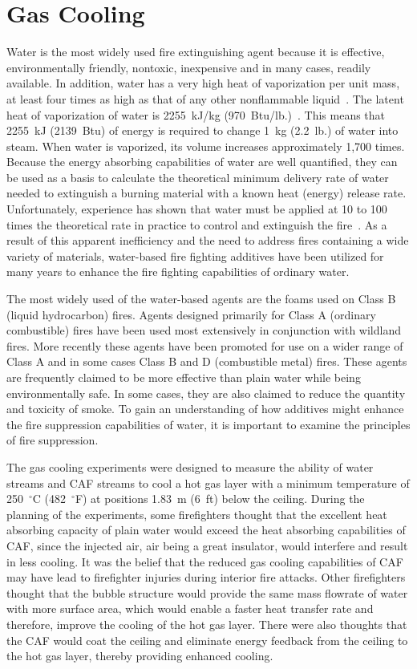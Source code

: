 \documentclass[12pt,oneside]{book}
\begin{document}
\section{Gas Cooling}
\label{sec:Gas_Cooling_discuss}
 
Water is the most widely used fire extinguishing agent because it is effective, environmentally friendly, nontoxic, inexpensive and in many cases, readily available. In addition, water has a very high heat of vaporization per unit mass, at least four times as high as that of any other nonflammable liquid~\cite{NFPA}. The latent heat of vaporization of water is 2255~kJ/kg (970~Btu/lb.)~\cite{NFPA}. This means that 2255~kJ (2139~Btu) of energy is required to change 1~kg (2.2~lb.) of water into steam.  When water is vaporized, its volume increases approximately 1,700 times. Because the energy absorbing capabilities of water are well quantified, they can be used as a basis to calculate the theoretical minimum delivery rate of water needed to extinguish a burning material with a known heat (energy) release rate. Unfortunately, experience has shown that water must be applied at 10 to 100 times the theoretical rate in practice to control and extinguish the fire~\cite{Friedman:2}. As a result of this apparent inefficiency and the need to address fires containing a wide variety of materials, water-based fire fighting additives have been utilized for many years to enhance the fire fighting capabilities of ordinary water.

The most widely used of the water-based agents are the foams used on Class B (liquid hydrocarbon) fires. Agents designed primarily for Class A (ordinary combustible) fires have been used most extensively in conjunction with wildland fires. More recently these agents have been promoted for use on a wider range of Class A and in some cases Class B and D (combustible metal) fires. These agents are frequently claimed to be more effective than plain water while being environmentally safe. In some cases, they are also claimed to reduce the quantity and toxicity of smoke. To gain an understanding of how additives might enhance the fire suppression capabilities of water, it is important to examine the principles of fire suppression.

The gas cooling experiments were designed to measure the ability of water streams and CAF streams to cool a hot gas layer with a minimum temperature of  250~$^{\circ}$C (482~$^{\circ}$F) at positions 1.83~m (6~ft) below the ceiling. During the planning of the experiments, some firefighters thought that the excellent heat absorbing capacity of plain water would exceed the heat absorbing capabilities of CAF, since the injected air, air being a great insulator, would interfere and result in less cooling. It was the belief that the reduced gas cooling capabilities of CAF may have lead to firefighter injuries during interior fire attacks. Other firefighters thought that the bubble structure would provide the same mass flowrate of water with more surface area, which would enable a faster heat transfer rate and therefore, improve the cooling of the hot gas layer. There were also thoughts that the CAF would coat the ceiling and eliminate energy feedback from the ceiling to the hot gas layer, thereby providing enhanced cooling.
\end{document}
